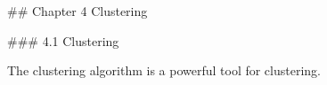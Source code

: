 

## Chapter 4 Clustering

### 4.1 Clustering

The clustering algorithm is a powerful tool for clustering.

